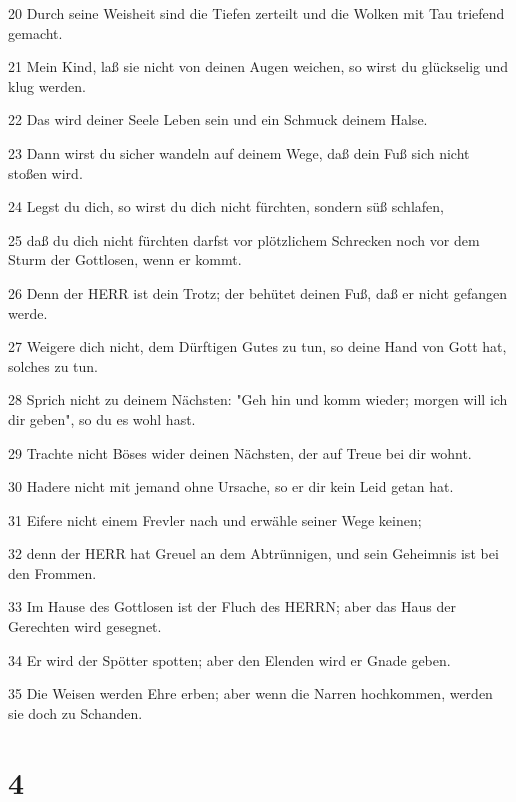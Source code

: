 \par 20 Durch seine Weisheit sind die Tiefen zerteilt und die Wolken mit Tau triefend gemacht.
\par 21 Mein Kind, laß sie nicht von deinen Augen weichen, so wirst du glückselig und klug werden.
\par 22 Das wird deiner Seele Leben sein und ein Schmuck deinem Halse.
\par 23 Dann wirst du sicher wandeln auf deinem Wege, daß dein Fuß sich nicht stoßen wird.
\par 24 Legst du dich, so wirst du dich nicht fürchten, sondern süß schlafen,
\par 25 daß du dich nicht fürchten darfst vor plötzlichem Schrecken noch vor dem Sturm der Gottlosen, wenn er kommt.
\par 26 Denn der HERR ist dein Trotz; der behütet deinen Fuß, daß er nicht gefangen werde.
\par 27 Weigere dich nicht, dem Dürftigen Gutes zu tun, so deine Hand von Gott hat, solches zu tun.
\par 28 Sprich nicht zu deinem Nächsten: "Geh hin und komm wieder; morgen will ich dir geben", so du es wohl hast.
\par 29 Trachte nicht Böses wider deinen Nächsten, der auf Treue bei dir wohnt.
\par 30 Hadere nicht mit jemand ohne Ursache, so er dir kein Leid getan hat.
\par 31 Eifere nicht einem Frevler nach und erwähle seiner Wege keinen;
\par 32 denn der HERR hat Greuel an dem Abtrünnigen, und sein Geheimnis ist bei den Frommen.
\par 33 Im Hause des Gottlosen ist der Fluch des HERRN; aber das Haus der Gerechten wird gesegnet.
\par 34 Er wird der Spötter spotten; aber den Elenden wird er Gnade geben.
\par 35 Die Weisen werden Ehre erben; aber wenn die Narren hochkommen, werden sie doch zu Schanden.

\chapter{4}

